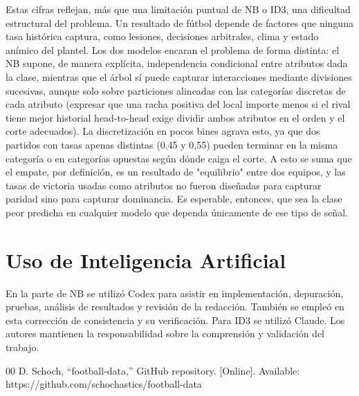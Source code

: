 \documentclass[conference]{IEEEtran}
\begin{document}
Estas cifras reflejan, más que una limitación puntual de NB o ID3, una dificultad estructural del problema. Un resultado de fútbol depende de factores que ninguna tasa histórica captura, como lesiones, decisiones arbitrales, clima y estado anímico del plantel. Los dos modelos encaran el problema de forma distinta: el NB supone, de manera explícita, independencia condicional entre atributos dada la clase, mientras que el árbol sí puede capturar interacciones mediante divisiones sucesivas, aunque solo sobre particiones alineadas con las categorías discretas de cada atributo (expresar que una racha positiva del local importe menos si el rival tiene mejor historial head-to-head exige dividir ambos atributos en el orden y el corte adecuados). La discretización en pocos bines agrava esto, ya que dos partidos con tasas apenas distintas (0,45 y 0,55) pueden terminar en la misma categoría o en categorías opuestas según dónde caiga el corte. A esto se suma que el empate, por definición, es un resultado de "equilibrio" entre dos equipos, y las tasas de victoria usadas como atributos no fueron diseñadas para capturar paridad sino para capturar dominancia. Es esperable, entonces, que sea la clase peor predicha en cualquier modelo que dependa únicamente de ese tipo de señal.

\section*{Uso de Inteligencia Artificial}
En la parte de NB se utilizó Codex para asistir en implementación, depuración, pruebas, análisis de resultados y revisión de la redacción. También se empleó en esta corrección de consistencia y su verificación. Para ID3 se utilizó Claude. Los autores mantienen la responsabilidad sobre la comprensión y validación del trabajo.

\begin{thebibliography}{00}
 D. Schoch, ``football-data,'' GitHub repository. [Online]. Available: https://github.com/schochastics/football-data
\end{thebibliography}
\end{document}
